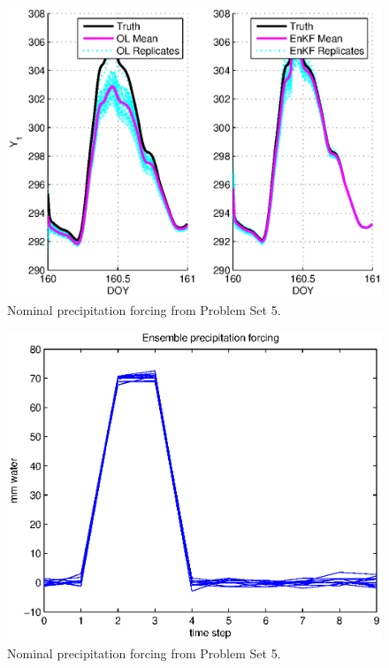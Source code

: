 \documentclass[letterpaper]{tufte-handout}
\begin{document}
    \begin{figure}
      \includegraphics[width=\textwidth]{3cy1}
      \caption{Nominal precipitation forcing from Problem Set 5.}
      \label{1b}
    \end{figure}
    \begin{figure}
      \includegraphics[width=\textwidth]{1b}
      \caption{Nominal precipitation forcing from Problem Set 5.}
      \label{1b}
    \end{figure}
\end{document}
